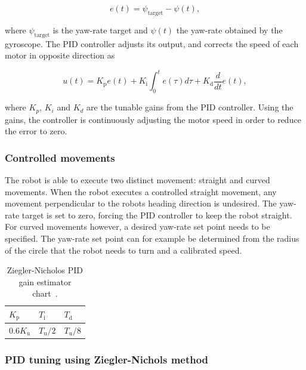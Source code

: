 \begin{equation}
	e(t) = \psi_{\text{target}} - \psi(t),
\end{equation}

\noindent
where $\psi_{\text{target}}$ is the yaw-rate target and $\psi(t)$ the yaw-rate obtained by the gyroscope.
The PID controller adjusts its output, and corrects the speed of each motor in opposite direction as

\begin{equation}
u(t) = K_{\text{p}}e(t) + K_{\text{i}} \int_{0}^{t}e(\tau)d\tau + K_{\text{d}}\frac{d}{dt}e(t),
\end{equation}

\noindent
where $K_{p}$, $K_{i}$ and $K_{d}$ are the tunable gains from the PID controller.
Using the gains, the controller is continuously adjusting the motor speed in order to reduce the error to zero.

\subsubsection{Controlled movements}

The robot is able to execute two distinct movement: straight and curved movements.
When the robot executes a controlled straight movement, any movement perpendicular to the robots heading direction is undesired.
The yaw-rate target is set to zero, forcing the PID controller to keep the robot straight.
For curved movements however, a desired yaw-rate set point needs to be specified.
The yaw-rate set point can for example be determined from the radius of the circle that the robot needs to turn and a calibrated speed.

\begin{table}[t]
	\centering
	\caption{Ziegler-Nicholos PID gain estimator chart~\cite{franklin_feedback_2015}.}
	\label{tab:gain_chart}
	\begin{tabular}{|l|l|l|} 
		\hline
		$K_{\text{p}}$ & $T_{\text{i}}$ & $T_{\text{d}}$ \\
		\hline \hline
		0.6$K_{\text{u}}$ & $T_{\text{u}}/2$ & $T_{\text{u}}/8$ \\
		\hline
	\end{tabular}
\end{table}

\subsubsection{PID tuning using Ziegler-Nichols method}

